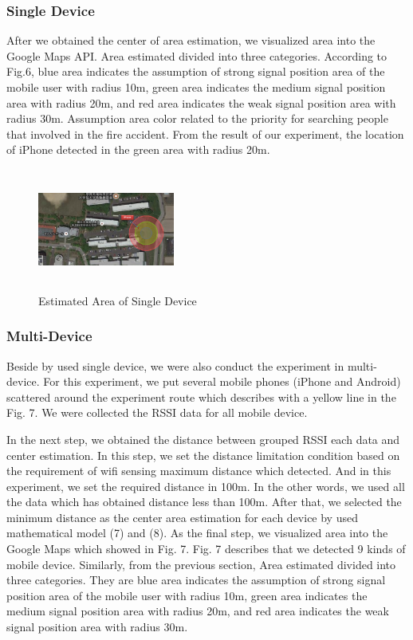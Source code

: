 \documentclass[twocolumn,10pt]{asme2ej}
\begin{document}
	\subsubsection{Single Device}
	After we obtained the center of area estimation, we visualized area into the Google Maps API. Area estimated divided into three categories. According to Fig.6, blue area indicates the assumption of strong signal position area of the mobile user with radius 10m, green area indicates the medium signal position area with radius 20m, and red area indicates the weak signal position area with radius 30m. Assumption area color related to the priority for searching people that involved in the fire accident. From the result of our experiment, the location of iPhone detected in the green area with radius 20m.
	\begin{figure}[t]
		\begin{center}
			\setlength{\unitlength}{0.012500in}%
			\includegraphics[width=0.4\textwidth,height=40mm]{Fig5a_AreaDetected.png}
		\end{center}
		\caption{Estimated Area of Single Device}
		\label{Area Detection} 
	\end{figure}
	
	\subsubsection{Multi-Device}
	Beside by used single device, we were also conduct the experiment in multi-device. For this experiment, we put several mobile phones (iPhone and Android) scattered around the experiment route which describes with a yellow line in the Fig. 7. We were collected the RSSI data for all mobile device. 
	
	In the next step, we obtained the distance between grouped RSSI each data and center estimation. In this step, we set the distance limitation condition based on the requirement of wifi sensing maximum distance which detected. And in this experiment, we set the required distance in 100m. In the other words, we used all the data which has obtained distance less than 100m. After that, we selected the minimum distance as the center area estimation for each device by used mathematical model (7) and (8). As the final step, we visualized area into the Google Maps which showed in Fig. 7. Fig. 7 describes that we detected 9 kinds of mobile device. Similarly, from the previous section, Area estimated divided into three categories. They are blue area indicates the assumption of strong signal position area of the mobile user with radius 10m, green area indicates the medium signal position area with radius 20m, and red area indicates the weak signal position area with radius 30m.
	
\end{document}
